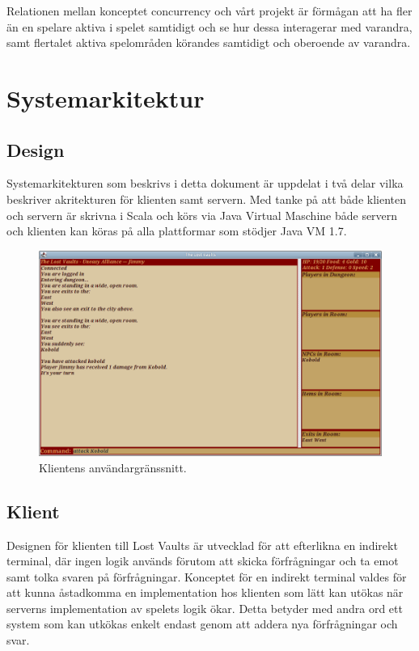 \documentclass[a4paper]{article}
\begin{document}
Relationen mellan konceptet concurrency och vårt projekt är förmågan att ha fler än en spelare aktiva i spelet samtidigt och se hur dessa interagerar med varandra, samt flertalet 
aktiva spelområden körandes samtidigt och oberoende av varandra.

\section{Systemarkitektur}
\subsection{Design}
Systemarkitekturen som beskrivs i detta dokument är uppdelat i två delar vilka beskriver akritekturen för klienten samt servern. Med tanke på att både klienten och servern är skrivna i Scala och körs via Java Virtual Maschine både servern och klienten kan köras på alla plattformar som stödjer Java VM 1.7.

\begin{figure}[hbt]
\centering
\includegraphics[width=1.0\textwidth]{client}
\caption{\label{fig:Client}Klientens användargränssnitt.}
\end{figure}

\subsection{Klient}
Designen för klienten till Lost Vaults är utvecklad för att efterlikna en indirekt terminal, där ingen logik används förutom att skicka förfrågningar och 
ta emot samt tolka svaren på förfrågningar. Konceptet för en indirekt terminal valdes för att kunna åstadkomma en implementation hos klienten som lätt kan utökas när serverns implementation av spelets logik ökar. Detta betyder med andra ord ett system som kan utkökas enkelt endast genom att addera nya förfrågningar och svar.
\end{document}
